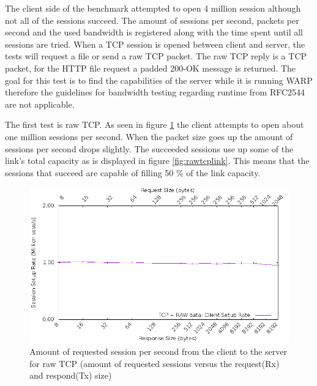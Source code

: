 The client side of the benchmark attempted to open 4 million session although not all of the sessions succeed.
The amount of sessions per second, packets per second and the used bandwidth is registered along with the time spent until all sessions are tried. 
When a TCP session is opened between client and server, the tests will request a file or send a raw TCP packet.
The raw TCP reply is a TCP packet, for the HTTP file request a padded 200-OK message is returned. 
The goal for this test is to find the capabilities of the server while it is running WARP therefore the guidelines for bandwidth testing regarding runtime from RFC2544 are not applicable. 

The first test is raw TCP. As seen in figure \ref{fig:rawtcpsession} the client attempts to open about one million sessions per second.
When the packet size goes up the amount of sessions per second drops slightly.
The succeeded sessions use up some of the link's total capacity as is displayed in figure \ref{fig:rawtcplink}.
This means that the sessions that succeed are capable of filling 50 \% of the link capacity.  

\begin{figure}[H]
  \includegraphics[scale=0.6]{images/raw_setup.png}
  \caption{Amount of requested session per second from the client to the server for raw TCP (amount of requested sessions versus the request(Rx) and respond(Tx) size)}
  \label{fig:rawtcpsession}
\end{figure}


